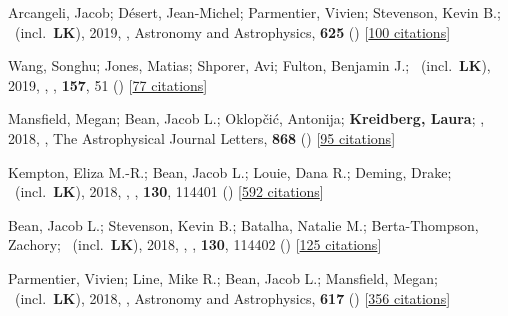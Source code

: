 \item[{\color{numcolor}\scriptsize27}] Arcangeli, Jacob; D{\'e}sert, Jean-Michel; Parmentier, Vivien; Stevenson, Kevin B.; \etal\ (incl.\ \textbf{LK}), 2019, , Astronomy and Astrophysics, \textbf{625} () [\href{https://ui.adsabs.harvard.edu/abs/2019A&A...625A.136A}{100 citations}]

\item[{\color{numcolor}\scriptsize26}] Wang, Songhu; Jones, Matias; Shporer, Avi; Fulton, Benjamin J.; \etal\ (incl.\ \textbf{LK}), 2019, , \aj, \textbf{157}, 51 () [\href{https://ui.adsabs.harvard.edu/abs/2019AJ....157...51W}{77 citations}]

\item[{\color{numcolor}\scriptsize25}] Mansfield, Megan; Bean, Jacob L.; Oklop{\v{c}}i{\'c}, Antonija; \textbf{Kreidberg, Laura}; \etal, 2018, , The Astrophysical Journal Letters, \textbf{868} () [\href{https://ui.adsabs.harvard.edu/abs/2018ApJ...868L..34M}{95 citations}]

\item[{\color{numcolor}\scriptsize24}] Kempton, Eliza M.-R.; Bean, Jacob L.; Louie, Dana R.; Deming, Drake; \etal\ (incl.\ \textbf{LK}), 2018, , \pasp, \textbf{130}, 114401 () [\href{https://ui.adsabs.harvard.edu/abs/2018PASP..130k4401K}{592 citations}]

\item[{\color{numcolor}\scriptsize23}] Bean, Jacob L.; Stevenson, Kevin B.; Batalha, Natalie M.; Berta-Thompson, Zachory; \etal\ (incl.\ \textbf{LK}), 2018, , \pasp, \textbf{130}, 114402 () [\href{https://ui.adsabs.harvard.edu/abs/2018PASP..130k4402B}{125 citations}]

\item[{\color{numcolor}\scriptsize22}] Parmentier, Vivien; Line, Mike R.; Bean, Jacob L.; Mansfield, Megan; \etal\ (incl.\ \textbf{LK}), 2018, , Astronomy and Astrophysics, \textbf{617} () [\href{https://ui.adsabs.harvard.edu/abs/2018A&A...617A.110P}{356 citations}]

